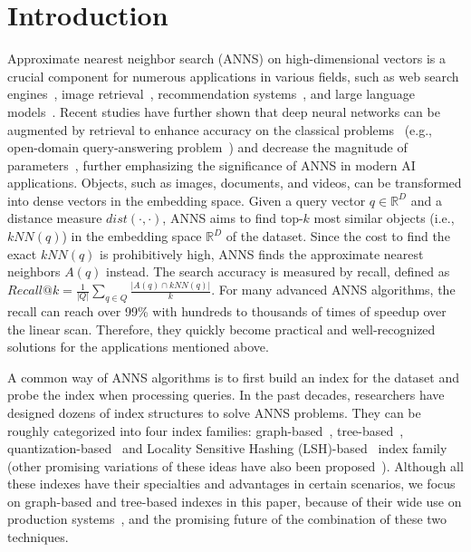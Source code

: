\documentclass[11pt]{article}
\begin{document}
\section{Introduction}
Approximate nearest neighbor search (ANNS) on high-dimensional vectors is a crucial component for numerous applications in various fields, such as web search engines~\cite{spann}, image retrieval~\cite{adbv}, recommendation systems~\cite{10.1145/1242572.1242610}, and large language models~\cite{openai}. 
Recent studies have further shown that deep neural networks can be augmented by retrieval to enhance accuracy on the classical problems~\cite{li2022survey} (e.g., open-domain query-answering problem~\cite{openqa}) and decrease the magnitude of parameters~\cite{pmlr-v119-guu20a}, further emphasizing the significance of ANNS in modern AI applications. Objects, such as images, documents, and videos, can be transformed into dense vectors in the embedding space. 
Given a query vector $q\in \mathbb{R}^D$ and a distance measure $dist(\cdot, \cdot)$, ANNS aims to find top-$k$ most similar objects (i.e., $kNN(q)$) in the embedding space $\mathbb{R}^D$ of the dataset.
Since the cost to find the exact $kNN(q)$ is prohibitively high, ANNS finds the approximate nearest neighbors $A(q)$ instead.
The search accuracy is measured by recall, defined as $Recall@k=\frac{1}{|Q|}\sum_{q\in Q}\frac{|A(q)\cap kNN(q)|}{k}$.
For many advanced ANNS algorithms, the recall can reach over 99\% with hundreds to thousands of times of speedup over the linear scan.
Therefore, they quickly become practical and well-recognized solutions for the applications mentioned above.

A common way of ANNS algorithms is to first build an index for the dataset and probe the index when processing queries.
In the past decades, researchers have designed dozens of index structures  to solve ANNS problems.
They can be roughly categorized into four index families: graph-based~\cite{wang-survey}, tree-based~\cite{hydra2,evolution}, quantization-based~\cite{pq} and Locality Sensitive Hashing (LSH)-based~\cite{focslsh,lsh} index family (other promising variations of these ideas have also been proposed~\cite{pdci,learnedanns}).
Although all these indexes have their specialties and advantages in certain scenarios, we focus on graph-based and tree-based indexes in this paper, because of their wide use on production systems~\cite{milvus,postgres,adbv}, and the promising future of the combination of these two techniques.
\end{document}
